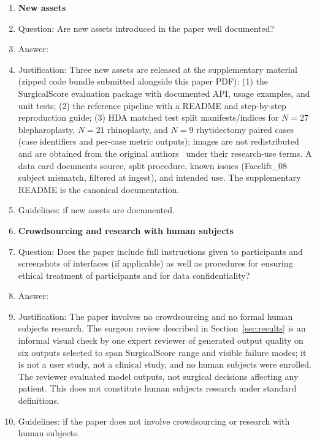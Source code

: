 \begin{enumerate}
\item {\bf New assets}
    \item[] Question: Are new assets introduced in the paper well documented?
    \item[] Answer: \answerYes{}
    \item[] Justification: Three new assets are released at the supplementary material (zipped code bundle submitted alongside this paper PDF): (1) the SurgicalScore evaluation package with documented API, usage examples, and unit tests; (2) the \method{} reference pipeline with a README and step-by-step reproduction guide; (3) HDA matched test split manifests/indices for $N{=}27$ blepharoplasty, $N{=}21$ rhinoplasty, and $N{=}9$ rhytidectomy paired cases (case identifiers and per-case metric outputs); images are not redistributed and are obtained from the original authors~\citep{rathgeb2020plastic} under their research-use terms. A data card documents source, split procedure, known issues (Facelift\_08 subject mismatch, filtered at ingest), and intended use. The supplementary README is the canonical documentation.
    \item[] Guidelines: \answerYes{} if new assets are documented.

\item {\bf Crowdsourcing and research with human subjects}
    \item[] Question: Does the paper include full instructions given to participants and screenshots of interfaces (if applicable) as well as procedures for ensuring ethical treatment of participants and for data confidentiality?
    \item[] Answer: \answerNA{}
    \item[] Justification: The paper involves no crowdsourcing and no formal human subjects research. The surgeon review described in Section~\ref{sec:results} is an informal visual check by one expert reviewer of generated output quality on six outputs selected to span SurgicalScore range and visible failure modes; it is not a user study, not a clinical study, and no human subjects were enrolled. The reviewer evaluated model outputs, not surgical decisions affecting any patient. This does not constitute human subjects research under standard definitions.
    \item[] Guidelines: \answerNA{} if the paper does not involve crowdsourcing or research with human subjects.


\end{enumerate}
